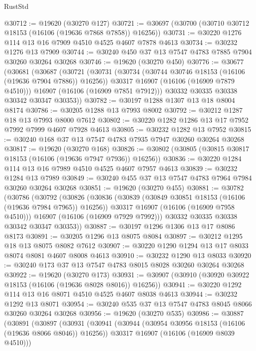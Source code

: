\begin{lexlean}{RustStd}
\begin{coremodule}
@30712 := @19620 (@30270 @127)
@30721 := @30697 (@30700 (@30710 @30712 @18153 (@16106 (@19636 @7868 @7858)) @16256))
@30731 := @30220 @1276 @114 @13 @16 @7909 @4510 @4525 @4607 @7878 @4613
@30734 := @30232 @1276 @13 @7909
@30744 := @30240 @450 @37 @13 @7547 @4783 @7885 @7904 @30260 @30264 @30268
@30746 := @19620 (@30270 @450)
@30776 := @30677
    (@30681
      (@30687
        (@30721
          (@30731
            (@30734 (@30744 @30746 @18153 (@16106 (@19636 @7904 @7886)) @16256))
            @30317
            @16907
            (@16106 (@16909 @7879 @4510)))
          @16907
          (@16106 (@16909 @7851 @7912)))
        @30332
        @30335
        @30338
        @30342
        @30347
        @30353))
@30782 := @30197 @1288 @1307 @13 @18 @8004 @8174
@30786 := @30205 @1288 @13 @7993 @8002
@30792 := @30212 @1287 @18 @13 @7993 @8000 @7612
@30802 := @30220 @1282 @1286 @13 @17 @7952 @7992 @7999 @4607 @7928 @4613
@30805 := @30232 @1282 @13 @7952
@30815 := @30240 @168 @37 @13 @7547 @4783 @7935 @7947 @30260 @30264 @30268
@30817 := @19620 (@30270 @168)
@30826 := @30802 (@30805 (@30815 @30817 @18153 (@16106 (@19636 @7947 @7936)) @16256))
@30836 := @30220 @1284 @114 @13 @16 @7989 @4510 @4525 @4607 @7957 @4613
@30839 := @30232 @1284 @13 @7989
@30849 := @30240 @455 @37 @13 @7547 @4783 @7964 @7984 @30260 @30264 @30268
@30851 := @19620 (@30270 @455)
@30881 := @30782
    (@30786
      (@30792
        (@30826
          (@30836
            (@30839 (@30849 @30851 @18153 (@16106 (@19636 @7984 @7965)) @16256))
            @30317
            @16907
            (@16106 (@16909 @7958 @4510)))
          @16907
          (@16106 (@16909 @7929 @7992)))
        @30332
        @30335
        @30338
        @30342
        @30347
        @30353))
@30887 := @30197 @1296 @1306 @13 @17 @8086 @8173
@30891 := @30205 @1296 @13 @8075 @8084
@30897 := @30212 @1295 @18 @13 @8075 @8082 @7612
@30907 := @30220 @1290 @1294 @13 @17 @8033 @8074 @8081 @4607 @8008 @4613
@30910 := @30232 @1290 @13 @8033
@30920 := @30240 @173 @37 @13 @7547 @4783 @8015 @8028 @30260 @30264 @30268
@30922 := @19620 (@30270 @173)
@30931 := @30907 (@30910 (@30920 @30922 @18153 (@16106 (@19636 @8028 @8016)) @16256))
@30941 := @30220 @1292 @114 @13 @16 @8071 @4510 @4525 @4607 @8038 @4613
@30944 := @30232 @1292 @13 @8071
@30954 := @30240 @535 @37 @13 @7547 @4783 @8045 @8066 @30260 @30264 @30268
@30956 := @19620 (@30270 @535)
@30986 := @30887
    (@30891
      (@30897
        (@30931
          (@30941
            (@30944 (@30954 @30956 @18153 (@16106 (@19636 @8066 @8046)) @16256))
            @30317
            @16907
            (@16106 (@16909 @8039 @4510)))

\end{coremodule}
\end{lexlean}
